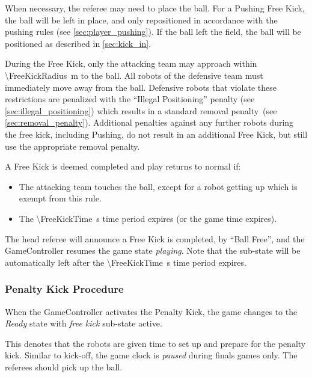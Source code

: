 When necessary, the referee may need to place the ball.
For a Pushing Free Kick, the ball will be left in place, and only repositioned in accordance with the pushing rules (see \cref{sec:player_pushing}).
If the ball left the field, the ball will be positioned as described in \cref{sec:kick_in}.

During the Free Kick, only the attacking team may approach within \qty{\FreeKickRadius}{\metre} to the ball. All robots of the defensive team must immediately move away from the ball. Defensive robots that violate these restrictions are penalized with the ``Illegal Positioning'' penalty (see \cref{sec:illegal_positioning}) which results in a standard removal penalty~(see \cref{sec:removal_penalty}).
Additional penalties against any further robots during the free kick, including Pushing, do not result in an additional Free Kick, but still use the appropriate removal penalty.

A Free Kick is deemed completed and play returns to normal if:
\begin{itemize}
    \item The attacking team touches the ball, except for a robot getting up which is exempt from this rule.
    \item The \qty{\FreeKickTime}{\second} time period expires (or the game time expires).
\end{itemize}
The head referee will announce a Free Kick is completed, by ``Ball Free'', and the GameController resumes the game state \emph{playing}. Note that the sub-state will be automatically left after the \qty{\FreeKickTime}{\second} time period expires.

\subsubsection{Penalty Kick Procedure}
\label{sec:penalty_free_kick}

When the GameController activates the Penalty Kick, the game changes to the \textit{Ready} state with \textit{free kick} sub-state active.

This denotes that the robots are given time to set up and prepare for the penalty kick.
Similar to kick-off, the game clock is \textit{paused} during finals games only.
The referees should pick up the ball.

